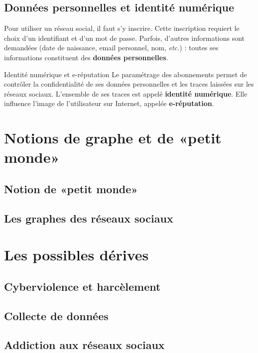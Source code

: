 \documentclass[11pt]{article}
\begin{document}
\subsection{Données personnelles et identité numérique}
\noindent Pour utiliser un réseau social, il faut s'y inscrire. Cette
inscription requiert le choix d'un identifiant et d'un mot de passe. Parfois,
d'autres informations sont demandées (date de naissance, email personnel, nom,
\emph{etc.}) : toutes ses informations constituent des \textbf{données
personnelles}.
\begin{defi}{Identité numérique et e-réputation}
  Le paramétrage des abonnements permet de contrôler la confidentialité de ses
  données personnelles et les traces laissées sur les réseaux sociaux.
  L'ensemble de ses traces est appelé \textbf{identité numérique}. Elle influence l'image
  de l'utilisateur sur Internet, appelée \textbf{e-réputation}.
\end{defi}

\section{Notions de graphe et de «petit monde»}
\subsection{Notion de «petit monde»}
\subsection{Les graphes des réseaux sociaux}

\section{Les possibles dérives}
\subsection{Cyberviolence et harcèlement}
\subsection{Collecte de données}
\subsection{Addiction aux réseaux sociaux}
\end{document}
